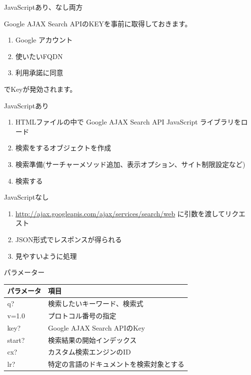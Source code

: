 \begin{frame}{JavaScriptあり、なし両方}

 Google AJAX Search APIのKEYを事前に取得しておきます。
 \begin{enumerate}
 \item Google アカウント
 \item 使いたいFQDN
 \item 利用承諾に同意
 \end{enumerate}
 でKeyが発効されます。
\end{frame}

\begin{frame}{JavaScriptあり}

 \begin{enumerate}
 \item HTMLファイルの中で Google AJAX Search API JavaScript ライブラリをロード
 \item 検索をするオブジェクトを作成
 \item 検索準備(サーチャーメソッド追加、表示オプション、サイト制限設定など)
 \item 検索する
 \end{enumerate}
\end{frame}

\begin{frame}{JavaScriptなし}

 \begin{enumerate}
 \item \url{http://ajax.googleapis.com/ajax/services/search/web}
 に引数を渡してリクエスト
 \item JSON形式でレスポンスが得られる
 \item 見やすいように処理
 \end{enumerate}
\end{frame}


\begin{frame}{パラメーター}

 \begin{tabular}{|l|l|}
 \hline
 パラメータ & 項目 \\
 \hline
   q? & 検索したいキーワード、検索式\\
 \hline
   v=1.0 & プロトコル番号の指定 \\
 \hline
   key? & Google AJAX Search APIのKey\\
 \hline
   start? & 検索結果の開始インデックス\\
 \hline
   cx? & カスタム検索エンジンのID\\
 \hline
   lr? & 特定の言語のドキュメントを検索対象とする \\
 \hline
 \end{tabular}

\end{frame}

